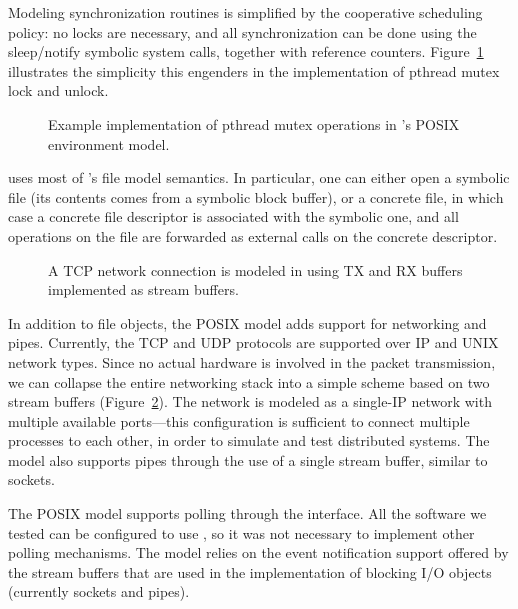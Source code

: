 Modeling synchronization routines is simplified by the cooperative scheduling policy:
%
no locks are necessary, and all synchronization can be done using the sleep/notify symbolic system calls, together with reference counters.  Figure~\ref{fig:mutexcode} illustrates the simplicity this engenders in the implementation of pthread mutex lock and unlock.

\begin{figure}
  \centering
  \caption{Example implementation of pthread mutex operations in \cnine's POSIX environment model.}
  \label{fig:mutexcode}
\end{figure}

\cnine uses most of \klee's file model semantics.
%
In particular, one can either open a symbolic file (its contents comes from a symbolic block buffer), or a concrete file, in which case a concrete file descriptor is associated with the symbolic one, and all operations on the file are forwarded as external calls on the concrete descriptor. 

\begin{figure}
  \centering
  \caption{A TCP network connection is modeled in \cnine using TX and RX buffers implemented as stream buffers.}
  \label{fig:networkmodel}
\end{figure}

In addition to file objects, the \cnine POSIX model adds support for networking and pipes.
%
Currently, the TCP and UDP protocols are supported over IP and UNIX network types. Since no actual hardware is involved in the packet transmission, we can collapse the entire networking stack into a simple scheme based on two stream buffers (Figure~\ref{fig:networkmodel}). The network is modeled as a single-IP network with multiple available ports---this configuration is sufficient to connect multiple processes to each other, in order to simulate and test distributed systems. The model also supports pipes through the use of a single stream buffer, similar to sockets.

The \cnine POSIX model supports polling through the  interface.
%
All the software we tested can be configured to use , so it was not necessary to implement other polling mechanisms.  The  model relies on the event notification support offered by the stream buffers that are used in the implementation of blocking I/O objects (currently sockets and pipes).

